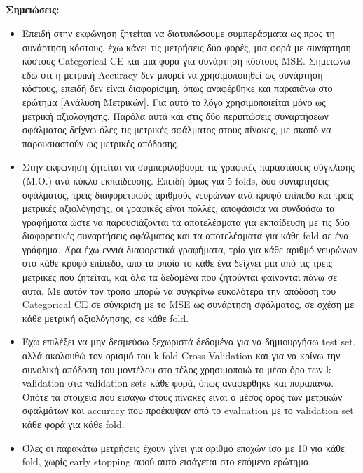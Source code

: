 \documentclass[12pt,a4paper]{article}
\begin{document}
\subsection{}
\textbf{Σημειώσεις:} 
\begin{itemize}
    \item Επειδή στην εκφώνηση ζητείται να διατυπώσουμε συμπεράσματα ως προς τη συνάρτηση κόστους, έχω κάνει τις μετρήσεις δύο φορές, μια φορά με συνάρτηση κόστους Categorical CE και μια φορά για συνάρτηση κόστους MSE. Σημειώνω εδώ ότι η μετρική Accuracy δεν μπορεί να χρησιμοποιηθεί ως συνάρτηση κόστους, επειδή δεν είναι διαφορίσιμη, όπως αναφέρθηκε και παραπάνω στο ερώτημα \ref{Ανάλυση Μετρικών}. Για αυτό το λόγο χρησιμοποιείται μόνο ως μετρική αξιολόγησης. Παρόλα αυτά και στις δύο περιπτώσεις συναρτήσεων σφάλματος δείχνω όλες τις μετρικές σφάλματος στους πίνακες, με σκοπό να παρουσιαστούν ως μετρικές απόδοσης.
    \item Στην εκφώνηση ζητείται να συμπεριλάβουμε τις γραφικές παραστάσεις σύγκλισης (Μ.Ο.) ανά κύκλο εκπαίδευσης. Επειδή όμως για 5 folds, δύο συναρτήσεις σφάλματος, τρεις διαφορετικούς αριθμούς νευρώνων ανά κρυφό επίπεδο και τρεις μετρικές αξιολόγησης, οι γραφικές είναι πολλές, αποφάσισα να συνδυάσω τα γραφήματα ώστε να παρουσιάζονται τα αποτελέσματα για εκπαίδευση με τις δύο διαφορετικές συναρτήσεις σφάλματος και τα αποτελέσματα για κάθε fold σε ένα γράφημα. Άρα έχω εννιά διαφορετικά γραφήματα, τρία για κάθε αριθμό νευρώνων στο κάθε κρυφό επίπεδο, από τα οποία το κάθε ένα δείχνει μια από τις τρεις μετρικές που ζητείται, και όλα τα δεδομένα που ζητούνται φαίνονται πάνω σε αυτά. Με αυτόν τον τρόπο μπορώ να συγκρίνω ευκολότερα την απόδοση του Categorical CE σε σύγκριση με το MSE ως συνάρτηση σφάλματος, σε σχέση με κάθε μετρική αξιολόγησης, σε κάθε fold.
    \item Έχω επιλέξει να μην δεσμεύσω ξεχωριστά δεδομένα για να δημιουργήσω test set, αλλά ακολουθώ τον ορισμό του k-fold Cross Validation και για να κρίνω την συνολική απόδοση του μοντέλου στο τέλος χρησιμοποιώ το μέσο όρο των k validation στα validation sets κάθε φορά, όπως αναφέρθηκε και παραπάνω. Οπότε τα στοιχεία που εισάγω στους πίνακες είναι ο μέσος όρος των μετρικών σφαλμάτων και accuracy που προέκυψαν από το evaluation με το validation set κάθε φορά για κάθε fold.
    \item Όλες οι παρακάτω μετρήσεις έχουν γίνει για αριθμό εποχών ίσο με 10 για κάθε fold, χωρίς early stopping αφού αυτό εισάγεται στο επόμενο ερώτημα.
\end{itemize}
\end{document}
